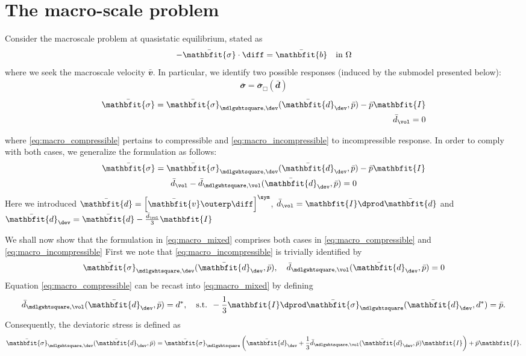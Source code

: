 \documentclass[a4paper,11pt]{article}
\renewcommand{\ta}[1]{\mathbfit{#1}}
\renewcommand{\ts}[1]{\mathbfit{#1}}
\renewcommand{\Box}{\mdlgwhtsquare}
\begin{document}

\section{The macro-scale problem}
Consider the macroscale problem at quasistatic equilibrium, stated as
\begin{align}
 -\bar{\ts\sigma}\cdot \diff = \bar{\ts b} \quad \text{in } \Omega
\end{align}
where we seek the macroscale velocity $\bar{\ts v}$. In particular, we identify two possible responses (induced by the submodel presented below):
\begin{gather}
 \bar{\ts\sigma} = \bar{\ts\sigma}_\Box(\bar{\ts d}) \label{eq:macro_compressible}
\end{gather}
\begin{subequations} \label{eq:macro_incompressible}
\begin{align}
  \bar{\ts\sigma} = \bar{\ts\sigma}_{\Box,\dev}(\bar{\ts d}_\dev, \bar p) - \bar p \ts I\\
  \bar{d}_\vol = 0
\end{align}
\end{subequations}


where \eqref{eq:macro_compressible} pertains to compressible and \eqref{eq:macro_incompressible} to incompressible response.
In order to comply with both cases, we generalize the formulation as follows:
\begin{subequations} \label{eq:macro_mixed}
\begin{gather}
 \bar{\ts\sigma} = \bar{\ts\sigma}_{\Box,\dev}(\bar{\ts d}_\dev,\bar p) - \bar p\ts I\\
 \bar{d}_\vol - \bar{d}_{\Box,\vol}(\bar{\ts d}_\dev, \bar p) = 0
\end{gather}
\end{subequations}
Here we introduced $\bar{\ts d} = \left[ \bar{\ta v} \outerp \diff \right]^\sym$, $\bar{d}_\vol = \ts I \dprod \bar{\ts d}$ and $\bar{\ts d}_\dev = \bar{\ts d} - \frac{\bar d_\vol}{3}\ts I$ 

We shall now show that the formulation in \eqref{eq:macro_mixed} comprises both cases in \eqref{eq:macro_compressible} and \eqref{eq:macro_incompressible}
First we note that \eqref{eq:macro_incompressible} is trivially identified by 
\begin{align}
 \bar{\ts\sigma}_{\Box,\dev}(\bar{\ts d}_\dev, \bar p), \quad \bar{d}_{\Box,\vol}(\bar{\ts d}_\dev,\bar p) = 0
\end{align}
Equation \eqref{eq:macro_compressible} can be recast into \eqref{eq:macro_mixed} by defining
\begin{align}
 \bar d_{\Box,\vol}(\bar{\ts d}_\dev, \bar p) = d^*,\quad \text{s.t. } -\frac13 \ts I\dprod \bar{\ts\sigma}_\Box(\bar{\ts d}_\dev, d^*) = \bar p.
\end{align}
Consequently, the deviatoric stress is defined as
\begin{align}
 \bar{\ts\sigma}_{\Box,\dev}(\bar{\ts d}_\dev,\bar p) = \bar{\ts\sigma}_\Box\left(\bar{\ts d}_\dev + \frac13 \bar{d}_{\Box,\vol}(\bar{\ts d}_\dev,\bar p)\ts I\right) + \bar p\ts I.
\end{align}
\end{document}
